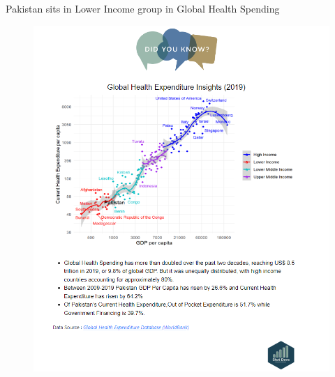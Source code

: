 \documentclass[
  ignorenonframetext,
]{beamer}
\begin{document}
\begin{frame}{Pakistan sits in Lower Income group in Global Health
Spending}
\protect\hypertarget{pakistan-sits-in-lower-income-group-in-global-health-spending}{}
\begin{figure}

{\centering \includegraphics{Final Global Health.png}

}

\end{figure}
\end{frame}
\end{document}
